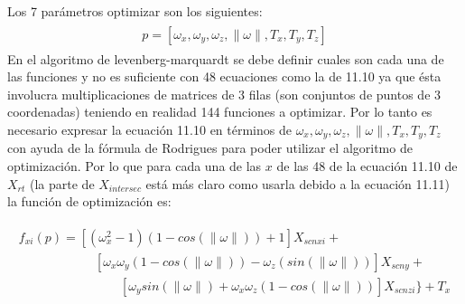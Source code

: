        	Los 7 parámetros optimizar son los siguientes:
       	\begin{eqnarray}
       	\begin{array}{c}
       	p=[\omega_x, \omega_y, \omega_z, \parallel\omega\parallel, T_x, T_y, T_z]
       	\end{array}
       	\end{eqnarray}
       	En el algoritmo de levenberg-marquardt se debe definir cuales son cada una de las funciones y no es suficiente con 48 ecuaciones como la de 11.10 ya que ésta involucra multiplicaciones de matrices de 3 filas (son conjuntos de puntos de 3 coordenadas) teniendo en realidad 144 funciones a optimizar. Por lo tanto es necesario expresar la ecuación 11.10 en términos de $\omega_x, \omega_y, \omega_z, \parallel\omega\parallel, T_x, T_y, T_z$ con ayuda de la fórmula de Rodrigues para poder utilizar el algoritmo de optimización. Por lo que para cada una de las $x$ de las 48 de la ecuación 11.10 de $X_{rt}$ (la parte de $X_{intersec}$ está más claro como usarla debido a la ecuación 11.11) la función de optimización es:
       	
       	\begin{eqnarray}
       	\begin{array}{c}
       	f_{xi}(p)=[(\omega_x^2-1)(1-cos(\parallel\omega\parallel))+1]X_{scnxi}+\\
       	\qquad \qquad \qquad  \left[\omega_x\omega_y(1-cos(\parallel\omega\parallel))-\omega_z(sin(\parallel\omega\parallel))\right]X_{scny}+\\
       	\qquad \qquad \qquad \qquad
       	\left[\omega_ysin(\parallel\omega\parallel)+\omega_x\omega_z(1-cos(\parallel\omega\parallel))\right]X_{scnzi}\}+T_x 
       	\end{array}
       	\end{eqnarray}
       	
